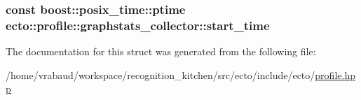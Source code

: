 \subsubsection[{\texorpdfstring{start\+\_\+time}{start_time}}]{\setlength{\rightskip}{0pt plus 5cm}const boost\+::posix\+\_\+time\+::ptime ecto\+::profile\+::graphstats\+\_\+collector\+::start\+\_\+time}\hypertarget{structecto_1_1profile_1_1graphstats__collector_a85cb67d72c9d1072634b879776e2e4b8}{}\label{structecto_1_1profile_1_1graphstats__collector_a85cb67d72c9d1072634b879776e2e4b8}


The documentation for this struct was generated from the following file\+:\begin{DoxyCompactItemize}
\item 
/home/vrabaud/workspace/recognition\+\_\+kitchen/src/ecto/include/ecto/\hyperlink{profile_8hpp}{profile.\+hpp}\end{DoxyCompactItemize}

